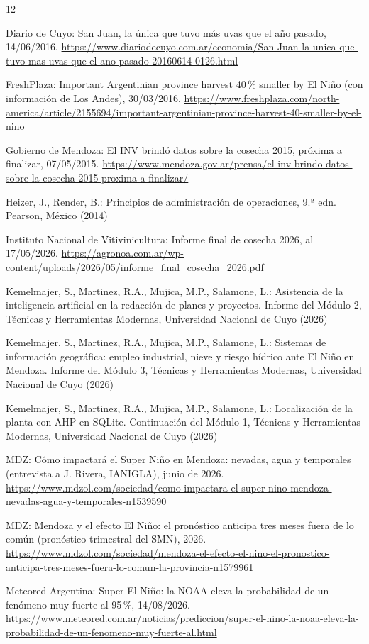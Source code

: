 \documentclass[runningheads]{llncs}
\begin{document}
\begin{thebibliography}{12}

Diario de Cuyo: San Juan, la única que tuvo más uvas que el año pasado, 14/06/2016. \url{https://www.diariodecuyo.com.ar/economia/San-Juan-la-unica-que-tuvo-mas-uvas-que-el-ano-pasado-20160614-0126.html}

FreshPlaza: Important Argentinian province harvest 40\,\% smaller by El Niño (con información de Los Andes), 30/03/2016. \url{https://www.freshplaza.com/north-america/article/2155694/important-argentinian-province-harvest-40-smaller-by-el-nino}

Gobierno de Mendoza: El INV brindó datos sobre la cosecha 2015, próxima a finalizar, 07/05/2015. \url{https://www.mendoza.gov.ar/prensa/el-inv-brindo-datos-sobre-la-cosecha-2015-proxima-a-finalizar/}

Heizer, J., Render, B.: Principios de administración de operaciones, 9.ª edn. Pearson, México (2014)

Instituto Nacional de Vitivinicultura: Informe final de cosecha 2026, al 17/05/2026. \url{https://agronoa.com.ar/wp-content/uploads/2026/05/informe_final_cosecha_2026.pdf}

Kemelmajer, S., Martinez, R.A., Mujica, M.P., Salamone, L.: Asistencia de la inteligencia artificial en la redacción de planes y proyectos. Informe del Módulo 2, Técnicas y Herramientas Modernas, Universidad Nacional de Cuyo (2026)

Kemelmajer, S., Martinez, R.A., Mujica, M.P., Salamone, L.: Sistemas de información geográfica: empleo industrial, nieve y riesgo hídrico ante El Niño en Mendoza. Informe del Módulo 3, Técnicas y Herramientas Modernas, Universidad Nacional de Cuyo (2026)

Kemelmajer, S., Martinez, R.A., Mujica, M.P., Salamone, L.: Localización de la planta con AHP en SQLite. Continuación del Módulo 1, Técnicas y Herramientas Modernas, Universidad Nacional de Cuyo (2026)

MDZ: Cómo impactará el Super Niño en Mendoza: nevadas, agua y temporales (entrevista a J. Rivera, IANIGLA), junio de 2026. \url{https://www.mdzol.com/sociedad/como-impactara-el-super-nino-mendoza-nevadas-agua-y-temporales-n1539590}

MDZ: Mendoza y el efecto El Niño: el pronóstico anticipa tres meses fuera de lo común (pronóstico trimestral del SMN), 2026. \url{https://www.mdzol.com/sociedad/mendoza-el-efecto-el-nino-el-pronostico-anticipa-tres-meses-fuera-lo-comun-la-provincia-n1579961}

Meteored Argentina: Super El Niño: la NOAA eleva la probabilidad de un fenómeno muy fuerte al 95\,\%, 14/08/2026. \url{https://www.meteored.com.ar/noticias/prediccion/super-el-nino-la-noaa-eleva-la-probabilidad-de-un-fenomeno-muy-fuerte-al.html}

\end{thebibliography}
\end{document}
